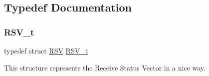 \subsection{Typedef Documentation}
\mbox{\label{group__rsv_gaf7fd94a9424fccb0aafa846f27a43099}} 
\subsubsection{\texorpdfstring{RSV\_t}{RSV\_t}}
{\footnotesize\ttfamily typedef struct \mbox{\hyperlink{struct_r_s_v}{R\+SV}}  \mbox{\hyperlink{group__rsv_gaf7fd94a9424fccb0aafa846f27a43099}{R\+S\+V\+\_\+t}}}



This structure represents the Receive Status Vector in a nice way. 

